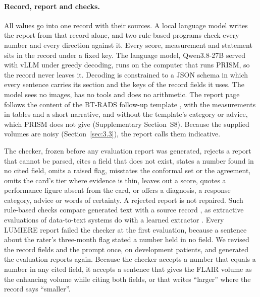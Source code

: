 \paragraph*{Record, report and checks.} All values go into one record with their sources. A local language model
writes the report from that record alone, and two rule-based programs check every number and every direction against
it. Every score, measurement and statement sits in the record under a fixed key. The language model, Qwen3.8-27B
served with vLLM \citep{kwon2023} under greedy decoding, runs on the computer that runs PRISM, so the record never
leaves it. Decoding is constrained to a JSON schema in which every sentence carries its section and the keys of the
record fields it uses. The model sees no images, has no tools and does no arithmetic. The report page follows the
content of the BT-RADS follow-up template \citep{weinberg2018}, with the measurements in tables and a short narrative,
and without the template's category or advice, which PRISM does not give (Supplementary Section~S8). Because the
supplied volumes are noisy (Section~\ref{sec:3.3}), the report calls them indicative.

The checker, frozen before any evaluation report was generated, rejects a report that cannot be parsed, cites a field
that does not exist, states a number found in no cited field, omits a raised flag, misstates the conformal set or the
agreement, omits the card's tier where evidence is thin, leaves out a score, quotes a performance figure absent from
the card, or offers a diagnosis, a response category, advice or words of certainty. A rejected report is not
repaired. Such rule-based checks compare generated text with a source record \citep{zeba2026}, as extractive
evaluations of data-to-text systems do with a learned extractor \citep{wiseman2017}. Every LUMIERE report failed the
checker at the first evaluation, because a sentence about the rater's three-month flag stated a number held in no
field. We revised the record fields and the prompt once, on development patients, and generated the evaluation
reports again. Because the checker accepts a number that equals a number in any cited field, it accepts a sentence
that gives the FLAIR volume as the enhancing volume while citing both fields, or that writes ``larger'' where the
record says ``smaller''.

